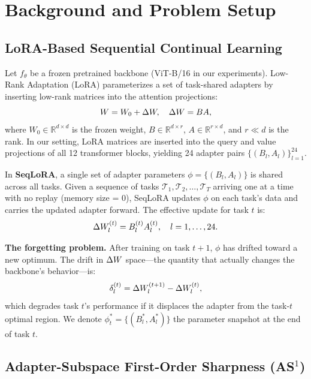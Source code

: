 \section{Background and Problem Setup}
\label{sec:background}

\subsection{LoRA-Based Sequential Continual Learning}

Let $f_\theta$ be a frozen pretrained backbone (ViT-B/16 in our experiments).
Low-Rank Adaptation (LoRA) parameterizes a set of task-shared adapters by inserting
low-rank matrices into the attention projections:
\begin{equation}
  W = W_0 + \Delta W, \quad \Delta W = BA,
\end{equation}
where $W_0 \in \mathbb{R}^{d \times d}$ is the frozen weight, $B \in \mathbb{R}^{d \times r}$,
$A \in \mathbb{R}^{r \times d}$, and $r \ll d$ is the rank.
In our setting, LoRA matrices are inserted into the query and value projections
of all 12 transformer blocks, yielding 24 adapter pairs $\{(B_l, A_l)\}_{l=1}^{24}$.

In \textbf{SeqLoRA}, a single set of adapter parameters $\phi = \{(B_l, A_l)\}$ is shared
across all tasks.
Given a sequence of tasks $\mathcal{T}_1, \mathcal{T}_2, \ldots, \mathcal{T}_T$ arriving
one at a time with no replay (memory size = 0),
SeqLoRA updates $\phi$ on each task's data and carries the updated adapter forward.
The effective update for task $t$ is:
\begin{equation}
  \Delta W_l^{(t)} = B_l^{(t)} A_l^{(t)}, \quad l = 1, \ldots, 24.
\end{equation}

\textbf{The forgetting problem.}
After training on task $t+1$, $\phi$ has drifted toward a new optimum.
The drift in $\Delta W$ space---the quantity that actually changes the backbone's behavior---is:
\begin{equation}
  \delta_l^{(t)} = \Delta W_l^{(t+1)} - \Delta W_l^{(t)},
\end{equation}
which degrades task $t$'s performance if it displaces the adapter from the task-$t$
optimal region. We denote $\phi^*_t = \{(B_l^*, A_l^*)\}$ the parameter snapshot
at the end of task $t$.

\subsection{Adapter-Subspace First-Order Sharpness (AS$^1$)}


